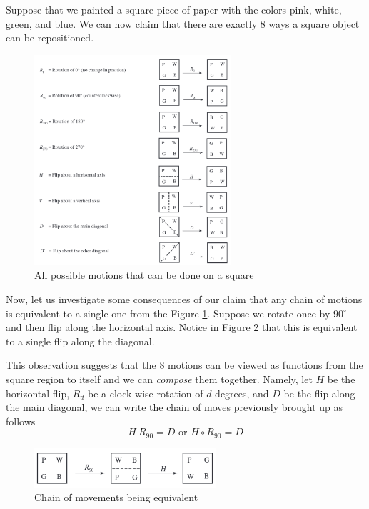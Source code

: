 Suppose that we painted a square piece of paper with the colors pink, white, green, and blue. We can now claim that there are exactly 8 ways a square object can be repositioned.

\begin{figure}
    \centering
    \includegraphics[width=0.65\textwidth]{images/ch1-movements-of-square.png}
    \caption{All possible motions that can be done on a square}
    \label{fig:sq-movements}
\end{figure}

Now, let us investigate some consequences of our claim that any chain of motions is equivalent to a single one from the Figure \ref{fig:sq-movements}. Suppose we rotate once by \(90^\circ\) and then flip along the horizontal axis. Notice in Figure \ref{fig:chain-moves} that this is equivalent to a single flip along the diagonal.

This observation suggests that the 8 motions can be viewed as functions from the square region to itself and we can \textit{compose} them together. Namely, let \(H\) be the horizontal flip, \(R_{d}\) be a clock-wise rotation of \(d\) degrees, and \(D\) be the flip along the main diagonal, we can write the chain of moves previously brought up as follows
\[
    H\ R_{90} = D \text{ or } H \circ R_{90} = D
\]

\begin{figure}[h]
    \centering
    \includegraphics[width=0.6\textwidth]{images/ch1-chain-of-movements.png}
    \caption{Chain of movements being equivalent}
    \label{fig:chain-moves}
\end{figure}

